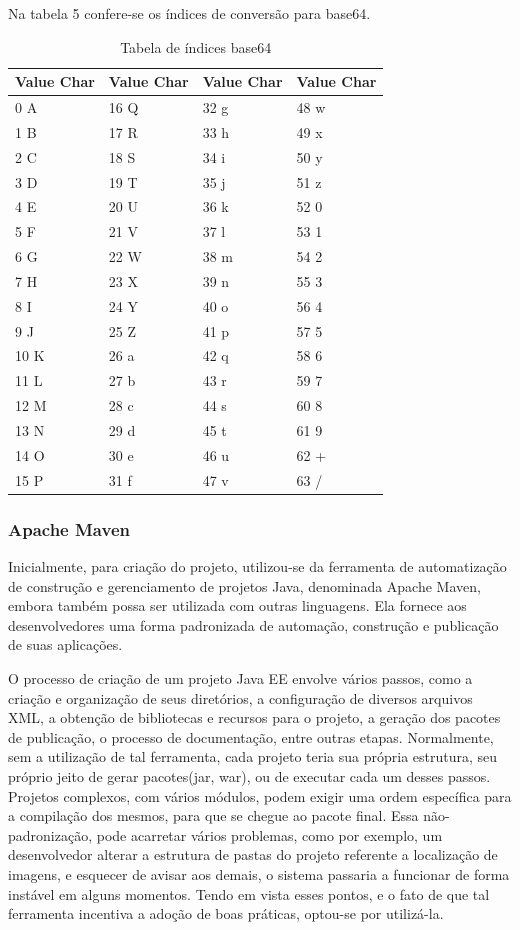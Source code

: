 \documentclass[12pt]{article}
\begin{document}
Na tabela 5 confere-se os índices de conversão para base64.

\begin{table}[ht]
	\centering
	\caption{Tabela de índices base64}
	\label{tab:Table5}
	\smallskip
	\begin{tabular}{ |l|l|l|l| }
		\hline
		Value Char&Value Char&Value Char&Value Char \\ \hline
		0	A&	16	Q&	32	g&	48	w \\ \hline
		1	B&	17	R&	33	h&	49	x \\ \hline
		2	C&	18	S&	34	i&	50	y \\ \hline
		3	D&	19	T&	35	j&	51	z \\ \hline
		4	E&	20	U&	36	k&	52	0 \\ \hline
		5	F&	21	V&	37	l&	53	1 \\ \hline
		6	G&	22	W&	38	m&	54	2 \\ \hline
		7	H&	23	X&	39	n&	55	3 \\ \hline
		8	I&	24	Y&	40	o&	56	4 \\ \hline
		9	J&	25	Z&	41	p&	57	5 \\ \hline
		10	K&	26	a&	42	q&	58	6 \\ \hline
		11	L&	27	b&	43	r&	59	7 \\ \hline
		12	M&	28	c&	44	s&	60	8 \\ \hline
		13	N&	29	d&	45	t&	61	9 \\ \hline
		14	O&	30	e&	46	u&	62	+ \\ \hline
		15	P&	31	f&	47	v&	63	/ \\ \hline
	\end{tabular}
\end{table}

\subsubsection{Apache Maven}

Inicialmente, para criação do projeto, utilizou-se da ferramenta de automatização de construção e gerenciamento de projetos Java, denominada Apache Maven, embora também possa ser utilizada com outras linguagens. Ela fornece aos desenvolvedores uma forma padronizada de automação, construção e publicação de suas aplicações.

O processo de criação de um projeto Java EE envolve vários passos, como a criação e organização de seus diretórios, a configuração de diversos arquivos XML, a obtenção de bibliotecas e recursos para o projeto, a geração dos pacotes de publicação, o processo de documentação, entre outras etapas. Normalmente, sem a utilização de tal ferramenta, cada projeto teria sua própria estrutura, seu próprio jeito de gerar pacotes(jar, war), ou de executar cada um desses passos. Projetos complexos, com vários módulos, podem exigir uma ordem específica para a compilação dos mesmos, para que se chegue ao pacote final. Essa não-padronização, pode acarretar vários problemas, como por exemplo, um desenvolvedor alterar a estrutura de pastas do projeto referente a localização de imagens, e esquecer de avisar aos demais, o sistema passaria a funcionar de forma instável em alguns momentos. Tendo em vista esses pontos, e o fato de que tal ferramenta incentiva a adoção de boas práticas, optou-se por utilizá-la.
\end{document}
